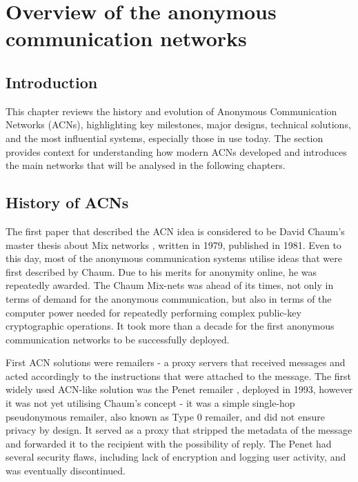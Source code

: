 \chapter{Overview of the anonymous communication networks }

\section{Introduction}
This chapter reviews the history and evolution of Anonymous Communication Networks (ACNs), highlighting key milestones, major designs, technical solutions, and the most influential systems, especially those in use today. The section provides context for understanding how modern ACNs developed and introduces the main networks that will be analysed in the following chapters.

\section{History of ACNs}
The first paper that described the ACN idea is considered to be David Chaum’s master thesis about Mix networks \cite{Chaum81}, written in 1979, published in 1981. Even to this day, most of the anonymous communication systems utilise ideas that were first described by Chaum. Due to his merits for anonymity online, he was repeatedly awarded. The Chaum Mix-nets was ahead of its times, not only in terms of demand for the anonymous communication, but also in terms of the computer power needed for repeatedly performing complex public-key cryptographic operations. It took more than a decade for the first anonymous communication networks to be successfully deployed.

First ACN solutions were remailers - a proxy servers that received messages and acted accordingly to the instructions that were attached to the message.
The first widely used ACN-like solution was the Penet remailer \cite{penet}, deployed in 1993, however it was not yet utilising Chaum’s concept - it was a simple single-hop pseudonymous remailer, also known as Type 0 remailer, and did not ensure privacy by design. It served as a proxy that stripped the metadata of the message and forwarded it to the recipient with the possibility of reply. The Penet had several security flaws, including lack of encryption and logging user activity, and was eventually discontinued.

